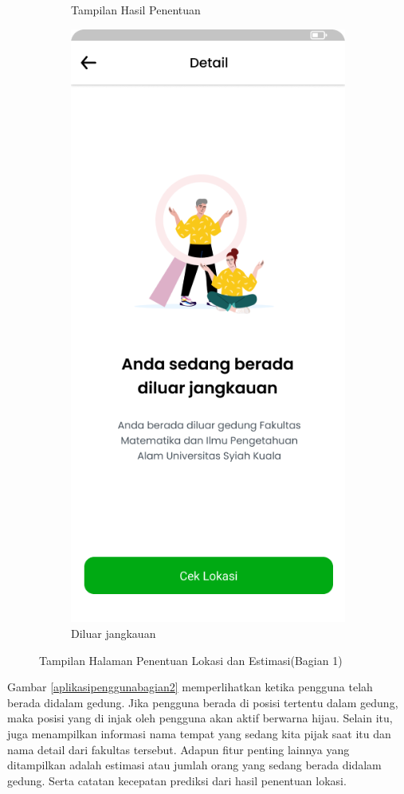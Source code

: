\begin{enumerate}[a.]
\begin{figure} [H]
\begin{subfigure}{.5\textwidth}
		\caption{Tampilan Hasil Penentuan}
	\end{subfigure}
	\begin{subfigure}{.5\textwidth}
		\centering
		\includegraphics[width=.5\linewidth]{gambar/diluarjangkauan.png}
		\caption{Diluar jangkauan}
	\end{subfigure}

	\caption{Tampilan Halaman Penentuan Lokasi dan Estimasi(Bagian 1)}
	\label{aplikasipenggunabagian1}
\end{figure}

\par Gambar \ref{aplikasipenggunabagian2} memperlihatkan ketika pengguna telah berada didalam gedung. Jika pengguna berada di posisi tertentu dalam gedung, maka posisi yang di injak oleh pengguna akan aktif berwarna hijau. Selain itu, juga menampilkan informasi nama tempat yang sedang kita pijak saat itu dan nama detail dari fakultas tersebut. Adapun fitur penting lainnya yang ditampilkan adalah estimasi atau jumlah orang yang sedang berada didalam gedung. Serta catatan kecepatan prediksi dari hasil penentuan lokasi.


\end{enumerate}
